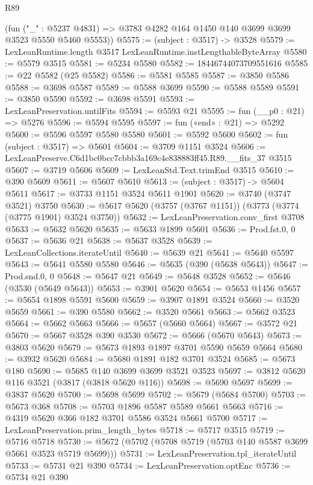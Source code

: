 \begin{lexlean}{R89}
\begin{coremodule}
      (fun ("_" : @5237 @4831) => @3783 @4282 @164 @1450 @140 @3699 @3699 @3523 @5550 @5460 @5553))
@5575 := (subject : @3517) -> @3528
@5579 := LexLeanRuntime.length @3517 LexLeanRuntime.instLengthableByteArray
@5580 := @5579 @3515
@5581 := @5234 @5580
@5582 := 18446744073709551616
@5585 := @22 @5582 (@25 @5582)
@5586 := @5581 @5585
@5587 := @3850 @5586
@5588 := @3698 @5587
@5589 := @5588 @3699
@5590 := @5588 @5589
@5591 := @3850 @5590
@5592 := @3698 @5591
@5593 := LexLeanPreservation.untilFits
@5594 := @5593 @21
@5595 := fun (__p0 : @21) => @5276
@5596 := @5594 @5595
@5597 := fun («end» : @21) => @5292
@5600 := @5596 @5597 @5580 @5580
@5601 := @5592 @5600
@5602 := fun (subject : @3517) => @5601
@5604 := @3709 @1151 @3524
@5606 := LexLeanPreserve.C6d1bc0bcc7cbbb3a169c4e838883ff45.R89.__fits_37 @3515
@5607 := @3719 @5606
@5609 := LexLeanStd.Text.trimEnd @3515
@5610 := @390 @5609
@5611 := @5607 @5610
@5613 := (subject : @3517) -> @5604 @5611
@5617 := @3733 @1151 @3524 @5611 @1901
@5620 := @3740 (@3747 @3521) @3750
@5630 := @5617 @5620 (@3757 (@3767 @1151)) (@3773 (@3774 (@3775 @1901) @3524 @3750))
@5632 := LexLeanPreservation.conv_first @3708
@5633 := @5632 @5620
@5635 := @5633 @1899 @5601
@5636 := Prod.fst.{0, 0}
@5637 := @5636 @21
@5638 := @5637 @3528
@5639 := LexLeanCollections.iterateUntil
@5640 := @5639 @21
@5641 := @5640 @5597
@5643 := @5641 @5580 @5580
@5646 := @5635 (@390 (@5638 @5643))
@5647 := Prod.snd.{0, 0}
@5648 := @5647 @21
@5649 := @5648 @3528
@5652 := @5646 (@3530 (@5649 @5643))
@5653 := @3901 @5620
@5654 := @5653 @1456
@5657 := @5654 @1898 @5591 @5600
@5659 := @3907 @1891 @3524
@5660 := @3520 @5659
@5661 := @390 @5580
@5662 := @3520 @5661
@5663 := @5662 @3523
@5664 := @5662 @5663
@5666 := @5657 (@5660 @5664)
@5667 := @3572 @21
@5670 := @5667 @3528 @390 @3530
@5672 := @5666 (@5670 @5643)
@5673 := @3803 @5620
@5679 := @5673 @1893 @1897 @3701 @5590 @5659 @5664
@5680 := @3932 @5620
@5684 := @5680 @1891 @182 @3701 @3524
@5685 := @5673 @180
@5690 := @5685 @140 @3699 @3699 @3521 @3523
@5697 := @3812 @5620 @116 @3521 (@3817 (@3818 @5620 @116))
@5698 := @5690 @5697
@5699 := @3837 @5620
@5700 := @5698 @5699
@5702 := @5679 (@5684 @5700)
@5703 := @5673 @368
@5708 := @5703 @1896 @5587 @5589 @5661 @5663
@5716 := @4319 @5620 @366 @182 @3701 @5586 @3524 @5661 @5700
@5717 := LexLeanPreservation.prim_length_bytes
@5718 := @5717 @3515
@5719 := @5716 @5718
@5730 := @5672 (@5702 (@5708 @5719 (@5703 @140 @5587 @3699 @5661 @3523 @5719 @5699)))
@5731 := LexLeanPreservation.tpl_iterateUntil
@5733 := @5731 @21 @390
@5734 := LexLeanPreservation.optEnc
@5736 := @5734 @21 @390

\end{coremodule}
\end{lexlean}
